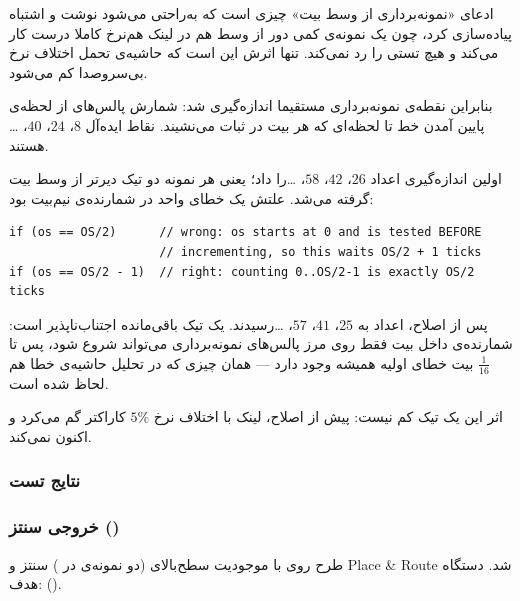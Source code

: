 \documentclass[10pt,a4paper]{article}
\begin{document}
ادعای «نمونه‌برداری از وسط بیت» چیزی است که به‌راحتی می‌شود نوشت و اشتباه پیاده‌سازی کرد، چون یک نمونه‌ی کمی دور از وسط هم در لینک هم‌نرخ کاملا درست کار می‌کند و هیچ تستی را رد نمی‌کند. تنها اثرش این است که حاشیه‌ی تحمل اختلاف نرخ بی‌سروصدا کم می‌شود.

بنابراین نقطه‌ی نمونه‌برداری مستقیما اندازه‌گیری شد: شمارش پالس‌های  از لحظه‌ی پایین آمدن خط تا لحظه‌ای که هر بیت در ثبات می‌نشیند. نقاط ایده‌آل $8$، $24$، $40$، \ldots هستند.

اولین اندازه‌گیری اعداد $26$، $42$، $58$، \ldots را داد؛ یعنی هر نمونه {دو تیک} دیرتر از وسط بیت گرفته می‌شد. علتش یک خطای واحد در شمارنده‌ی نیم‌بیت بود:

\begin{latin}
\begin{lstlisting}[style=verilog,numbers=none]
if (os == OS/2)      // wrong: os starts at 0 and is tested BEFORE
                     // incrementing, so this waits OS/2 + 1 ticks
if (os == OS/2 - 1)  // right: counting 0..OS/2-1 is exactly OS/2 ticks
\end{lstlisting}
\end{latin}

پس از اصلاح، اعداد به $25$، $41$، $57$، \ldots رسیدند. یک تیک باقی‌مانده اجتناب‌ناپذیر است: شمارنده‌ی داخل بیت فقط روی مرز پالس‌های نمونه‌برداری می‌تواند شروع شود، پس تا $\frac{1}{16}$ بیت خطای اولیه همیشه وجود دارد — همان چیزی که در تحلیل حاشیه‌ی خطا هم لحاظ شده است.

اثر این یک تیک کم نیست: پیش از اصلاح، لینک با اختلاف نرخ $5\%$ کاراکتر گم می‌کرد و اکنون نمی‌کند.

\subsubsection*{نتایج تست}

\begin{latin}

\end{latin}

\pagebreak
\subsubsection*{خروجی سنتز ()}

طرح روی  با موجودیت سطح‌بالای  (دو نمونه‌ی  در ) سنتز و Place \& Route شد. دستگاه هدف:  ().
\end{document}
